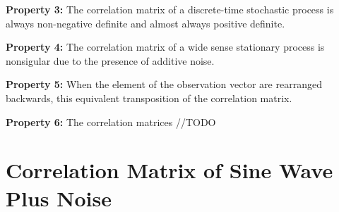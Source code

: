 \documentclass{article}
\begin{document}
    \noindent\textbf{Property 3:} The correlation matrix of a discrete-time stochastic process is always non-negative
    definite and almost always positive definite.

    \noindent\textbf{Property 4:} The correlation matrix of a wide sense stationary process is nonsigular due to the 
    presence of additive noise.

    \noindent\textbf{Property 5:} When the element of the observation vector are rearranged backwards, this equivalent
    transposition of the correlation matrix.
    
    \noindent\textbf{Property 6:} The correlation matrices //TODO

    \section{Correlation Matrix of Sine Wave Plus Noise}
   
\end{document}
